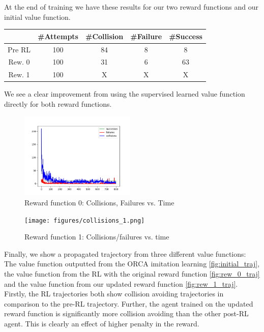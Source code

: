 \documentclass[conference]{IEEEtran}
\begin{document}
At the end of training we have these results for our two reward functions and our initial value function. 
\begin{center}
\begin{tabular}{||c c c c c||} 
 \hline
  & \#Attempts & \#Collision  & \#Failure  & \#Success \\ [0.5ex] 
 \hline\hline
 Pre RL & 100 & 84 & 8  & 8 \\ 
 \hline
 Rew. 0 & 100 & 31 & 6  & 63 \\
 Rew. 1 & 100 & X & X  & X \\
 \hline
\end{tabular}
\end{center}

We see a clear improvement from using the supervised learned value function directly for both reward functions. 
\begin{figure}
    \centering
    \includegraphics[width=0.49\textwidth]{docs/latex/figures/statistics_rew0.png}
    \caption{Reward function 0: Collisions, Failures vs. Time}
    \label{fig:rew_0_coll}
\end{figure}
\begin{figure}
    \centering
    \texttt{[image: figures/collisions\_1.png]}
    \caption{Reward function 1: Collisions/failures vs. time}
    \label{fig:rew_1_coll}
\end{figure}

Finally, we show a propagated trajectory from three different value functions: The value function outputted from the ORCA imitation learning \ref{fig:initial_traj}, the value function from the RL with the original reward function \ref{fig:rew_0_traj} and the value function from our updated reward function \ref{fig:rew_1_traj}. Firstly, the RL trajectories both show collision avoiding trajectories in comparison to the pre-RL trajectory. Further, the agent trained on the updated reward function is significantly more collision avoiding than the other post-RL agent. This is clearly an effect of higher penalty in the reward. 
\end{document}
